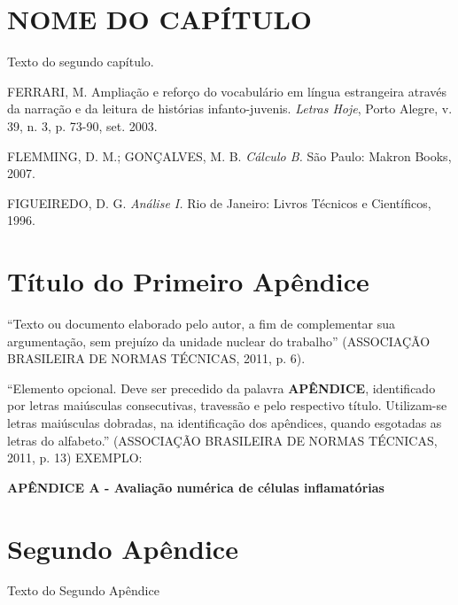 \documentclass[
        12pt,
        openany, %
        oneside, %
        a4paper,			
        english,			
        brazil			        %
        ]{abntbibufjf}
\begin{document}
\chapter{NOME DO CAP\'ITULO}

Texto do segundo cap\'itulo.




\postextual

\begin{thebibliography}{99}


 FERRARI, M. Amplia\c{c}\~ao e refor\c{c}o do vocabul\'ario em l\'ingua estrangeira atrav\'es da narra\c{c}\~ao e 
da leitura de hist\'orias infanto-juvenis. \textit{Letras Hoje}, Porto Alegre, v. 39, n. 3, p. 73-90, set. 2003.

 FLEMMING, D. M.; GON\c{C}ALVES, M. B. \textit{C\'alculo B.} S\~ao Paulo: Makron Books, 2007.

 FIGUEIREDO, D. G. \textit{An\'alise I.} Rio de Janeiro: Livros T\'ecnicos e Cient\'ificos, 1996.

\end{thebibliography}





\begin{apendicesenv}

\chapter{T\'itulo do Primeiro Ap\^endice}

``Texto ou documento elaborado pelo autor, a fim de complementar sua argumenta\c{c}\~ao, 
sem preju\'izo da unidade nuclear do trabalho''
(ASSOCIA\c{C}\~AO BRASILEIRA DE NORMAS T\'ECNICAS, 2011, p. 6).

``Elemento opcional. Deve ser precedido da palavra \textbf{AP\^ENDICE}, identificado por letras mai\'usculas 
consecutivas, travess\~ao e pelo respectivo t\'itulo. Utilizam-se letras mai\'usculas dobradas, 
na identifica\c{c}\~ao dos ap\^endices, quando esgotadas as letras do alfabe\-to.''
(ASSOCIA\c{C}\~AO BRASILEIRA DE NORMAS T\'ECNICAS, 2011, p. 13)
\newline
EXEMPLO:
\begin{center}
\textbf{AP\^ENDICE A - Avalia\c{c}\~ao num\'erica de c\'elulas inflamat\'orias}
\end{center}


\chapter{Segundo Ap\^endice}
Texto do Segundo Ap\^endice 
\end{apendicesenv}
\end{document}
